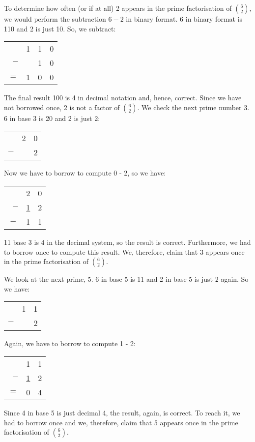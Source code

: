 \documentclass[tikz]{scrreprt}
\begin{document}
To determine how often (or if at all) 
2 appears in the prime factorisation of $\binom{6}{2}$,
we would perform the subtraction $6-2$ in
binary format.
6 in binary format is 110 and
2 is just 10.
So, we subtract:

\begin{tabular}{r r r r}
    & 1 & 1 & 0 \\
$-$ &   & 1 & 0 \\
$=$ & 1 & 0 & 0
\end{tabular}

The final result 100 is 4
in decimal notation and, hence, correct.
Since we have not borrowed once,
2 is not a factor of $\binom{6}{2}$.
We check the next prime number 3.
6 in base 3 is 20 and 2 is just 2:

\begin{tabular}{r r r}
    & 2 & 0 \\
$-$ &   & 2 
\end{tabular}

Now we have to borrow
to compute 0 - 2,
so we have:

\begin{tabular}{r r r}
    & 2             & 0 \\
$-$ & \underline{1} & 2 \\
$=$ & 1             & 1 
\end{tabular}

11 base 3 is 4 in the decimal system,
so the result is correct.
Furthermore, we had to borrow once
to compute this result.
We, therefore, claim that 3 appears once
in the prime factorisation of $\binom{6}{2}$.

We look at the next prime, 5.
6 in base 5 is 11 and 2 in base 5 is just 2 again.
So we have:

\begin{tabular}{r r r}
    & 1 & 1 \\
$-$ &   & 2 
\end{tabular}

Again, we have to borrow
to compute 1 - 2:

\begin{tabular}{r r r}
    & 1             & 1 \\
$-$ & \underline{1} & 2 \\
$=$ & 0             & 4 
\end{tabular}

Since 4 in base 5 is just decimal 4,
the result, again, is correct.
To reach it, we had to borrow once
and we, therefore, claim that 5
appears once in the prime factorisation of
$\binom{6}{2}$.
\end{document}
